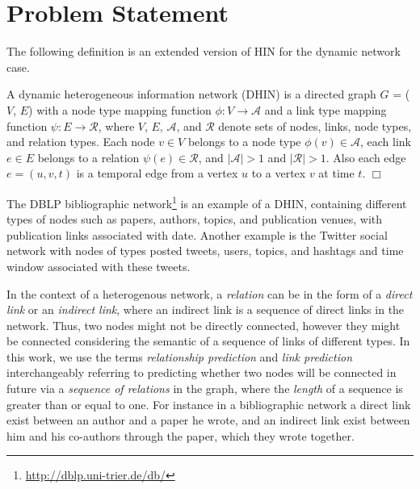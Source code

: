 \section{Problem Statement}

The following definition is an extended version of HIN \cite{sun2011pathsim} for the dynamic network case.

\begin{definition}
A dynamic heterogeneous information network (DHIN) is a directed graph $G$ = ($V$, $E$) with a node type mapping function $\phi: V \rightarrow \mathcal{A}$ and a link type mapping function $\psi: E \rightarrow \mathcal{R}$, where $V$, $E$, $\mathcal{A}$, and $\mathcal{R}$ denote sets of nodes, links, node types, and relation types. Each node $v \in V$ belongs to a node type $\phi(v) \in \mathcal{A}$, each link $e \in E$ belongs to a relation $\psi(e) \in \mathcal{R}$, and $|\mathcal{A}| > 1$ and $|\mathcal{R}| > 1$.  Also each edge $e = (u, v, t)$ is a temporal edge from a vertex $u$ to a vertex $v$ at time $t$. 
$\Box$ 

\end{definition}

The DBLP bibliographic network\footnote{\url{http://dblp.uni-trier.de/db/}} is an example of a DHIN, containing different types of nodes such as papers, authors, topics, and publication venues, with publication links associated with date. Another example is the Twitter social network with nodes of types posted tweets, users, topics, and hashtags and time window associated with these tweets. %

In the context of a heterogenous network, a \textit{relation} can be in the form of a \textit{direct link} or an \textit{indirect link}, where an indirect link is a sequence of direct links in the network. Thus, two nodes might not be directly connected, however they might be connected considering the semantic of a sequence of links of different types. In this work, we use the terms \textit{relationship prediction} and \textit{link prediction} interchangeably referring to predicting whether two nodes will be connected in future via a \textit{sequence of relations} in the graph, where the \textit{length} of a sequence is greater than or equal to one. For instance in a bibliographic network a direct link exist between an author and a paper he wrote, and an indirect link exist between him and his co-authors through the paper, which they wrote together.

